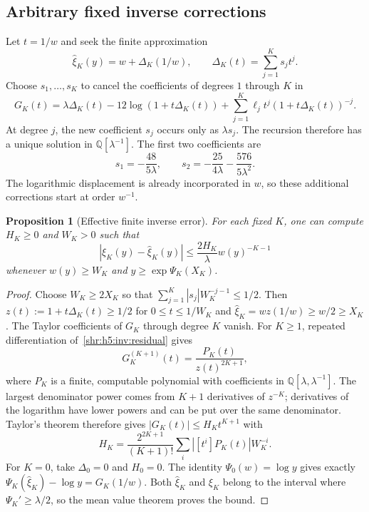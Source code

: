 \documentclass[11pt,letterpaper]{article}
\numberwithin{equation}{section}
\newtheorem{proposition}[theorem]{Proposition}
\theoremstyle{definition}
\newcommand{\Q}{\mathbb Q}
\newcommand{\1}{\mathbf 1}
\begin{document}
\subsection{Arbitrary fixed inverse corrections}
Let $t=1/w$ and seek the finite approximation
\begin{equation}
 \widehat\xi_K(y)=w+\Delta_K(1/w),\qquad
 \Delta_K(t)=\sum_{j=1}^Ks_jt^j.
 \label{shr:h5:inv:approx}
\end{equation}
Choose $s_1,\ldots,s_K$ to cancel the coefficients of degrees $1$ through
$K$ in
\begin{equation}
 G_K(t)=\lambda\Delta_K(t)-12\log(1+t\Delta_K(t))
       +\sum_{j=1}^K\ell_jt^j(1+t\Delta_K(t))^{-j}.
 \label{shr:h5:inv:residual}
\end{equation}
At degree $j$, the new coefficient $s_j$ occurs only as $\lambda s_j$.
The recursion therefore has a unique solution in
$\Q[\lambda^{-1}]$. The first two coefficients are
\begin{equation}
 s_1=-\frac{48}{5\lambda},\qquad
 s_2=-\frac{25}{4\lambda}-\frac{576}{5\lambda^2}.
 \label{shr:h5:inv:firstcoeffs}
\end{equation}
The logarithmic displacement is already incorporated in $w$, so these
additional corrections start at order $w^{-1}$.

\begin{proposition}[Effective finite inverse error]
\label{shr:h5:inv:finiteerror}
For each fixed $K$, one can compute $H_K\ge0$ and $W_K>0$ such that
\begin{equation}
 |\xi_K(y)-\widehat\xi_K(y)|
 \le\frac{2H_K}{\lambda}w(y)^{-K-1}
 \label{shr:h5:inv:bound}
\end{equation}
whenever $w(y)\ge W_K$ and $y\ge\exp\Psi_K(X_K)$.
\end{proposition}
\begin{proof}
Choose $W_K\ge2X_K$ so that
$\sum_{j=1}^K|s_j|W_K^{-j-1}\le1/2$. Then
$z(t):=1+t\Delta_K(t)\ge1/2$ for $0\le t\le1/W_K$ and
$\widehat\xi_K=wz(1/w)\ge w/2\ge X_K$.
The Taylor coefficients of $G_K$ through degree $K$ vanish.
For $K\ge1$, repeated differentiation of~\eqref{shr:h5:inv:residual} gives
\[
 G_K^{(K+1)}(t)=\frac{P_K(t)}{z(t)^{2K+1}},
\]
where $P_K$ is a finite, computable polynomial with coefficients in
$\Q[\lambda,\lambda^{-1}]$. The largest denominator power comes from
$K+1$ derivatives of $z^{-K}$; derivatives of the logarithm have lower
powers and can be put over the same denominator.
Taylor's theorem therefore gives $|G_K(t)|\le H_Kt^{K+1}$ with
\begin{equation}
 H_K=\frac{2^{2K+1}}{(K+1)!}
                  \sum_i|[t^i]P_K(t)|W_K^{-i}.
 \label{shr:h5:inv:H}
\end{equation}
For $K=0$, take $\Delta_0=0$ and $H_0=0$.
The identity $\Psi_0(w)=\log y$ gives exactly
$\Psi_K(\widehat\xi_K)-\log y=G_K(1/w)$.
Both $\widehat\xi_K$ and $\xi_K$ belong to the interval where
$\Psi_K'\ge\lambda/2$, so the mean value theorem proves the bound.
\end{proof}
\end{document}
